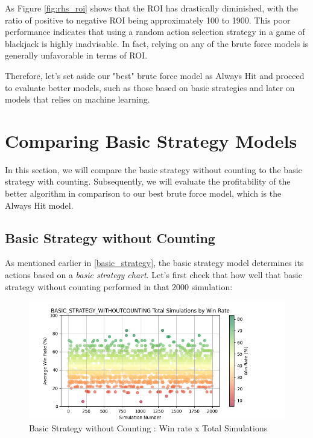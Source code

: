 \documentclass[a4paper,12pt]{report}
\begin{document}
As Figure \ref{fig:rhs_roi} shows that the ROI has drastically diminished, with the ratio of positive to negative ROI being approximately 100 to 1900. This poor performance indicates that using a random action selection strategy in a game of blackjack is highly inadvisable. In fact, relying on any of the brute force models is generally unfavorable in terms of ROI. 

Therefore, let's set aside our "best" brute force model as Always Hit and proceed to evaluate better models, such as those based on basic strategies and later on models that relies on machine learning.

\section{Comparing Basic Strategy Models}
In this section, we will compare the basic strategy without counting to the basic strategy with counting. Subsequently, we will evaluate the profitability of the better algorithm in comparison to our best brute force model, which is the Always Hit model.

\subsection{Basic Strategy without Counting}
As mentioned earlier in \ref{basic_strategy}, the basic strategy model determines its actions based on a \textit{basic strategy chart}. Let's first check that how well that basic strategy without counting performed in that 2000 simulation:

\begin{figure}[h]
\begin{center}
\includegraphics[scale=0.6]{figures/graphs/bswc_wr_ts.png}
\end{center}
\caption{Basic Strategy without Counting : Win rate x Total Simulations}
\label{fig:bswc_wr_ts}
\end{figure}
\end{document}
